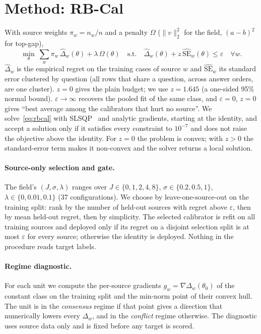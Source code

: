\documentclass[11pt]{article}
\theoremstyle{remark}
\begin{document}
\section{Method: RB-Cal}\label{sec:method}
With source weights $\pi_w=n_w/n$ and a penalty $\Omega$ ($\|v\|_2^2$ for the field, $(a-b)^2$ for top-gap),
\begin{equation}\label{eq:rbcal}
\min_{\theta}\ \sum_w \pi_w\,\hat\Delta_w(\theta)+\lambda\,\Omega(\theta)
\quad\text{s.t.}\quad \hat\Delta_w(\theta)+z\,\widehat{\mathrm{SE}}_w(\theta)\le\varepsilon\quad\forall w .
\end{equation}
$\hat\Delta_w$ is the empirical regret on the training cases of source $w$ and $\widehat{\mathrm{SE}}_w$ its standard error clustered by question (all rows that share a question, across answer orders, are one cluster).
$z=0$ gives the plain budget; we use $z=1.645$ (a one-sided 95\% normal bound).
$\varepsilon\to\infty$ recovers the pooled fit of the same class, and $\varepsilon=0$, $z=0$ gives ``best average among the calibrators that hurt no source''.
We solve~\eqref{eq:rbcal} with SLSQP~\citep{kraft1988slsqp} and analytic gradients, starting at the identity, and accept a solution only if it satisfies every constraint to $10^{-7}$ and does not raise the objective above the identity.
For $z=0$ the problem is convex; with $z>0$ the standard-error term makes it non-convex and the solver returns a local solution.

\paragraph{Source-only selection and gate.}
The field's $(J,\sigma,\lambda)$ ranges over $J\in\{0,1,2,4,8\}$, $\sigma\in\{0.2,0.5,1\}$, $\lambda\in\{0,0.01,0.1\}$ (37 configurations).
We choose by leave-one-source-out on the training split: rank by the number of held-out sources with regret above $\varepsilon$, then by mean held-out regret, then by simplicity.
The selected calibrator is refit on all training sources and deployed only if its regret on a disjoint selection split is at most $\varepsilon$ for every source; otherwise the identity is deployed.
Nothing in the procedure reads target labels.

\paragraph{Regime diagnostic.}
For each unit we compute the per-source gradients $g_w=\nabla\Delta_w(\theta_0)$ of the constant class on the training split and the min-norm point of their convex hull.
The unit is in the \emph{consensus} regime if that point gives a direction that numerically lowers every $\Delta_w$, and in the \emph{conflict} regime otherwise.
The diagnostic uses source data only and is fixed before any target is scored.
\end{document}
